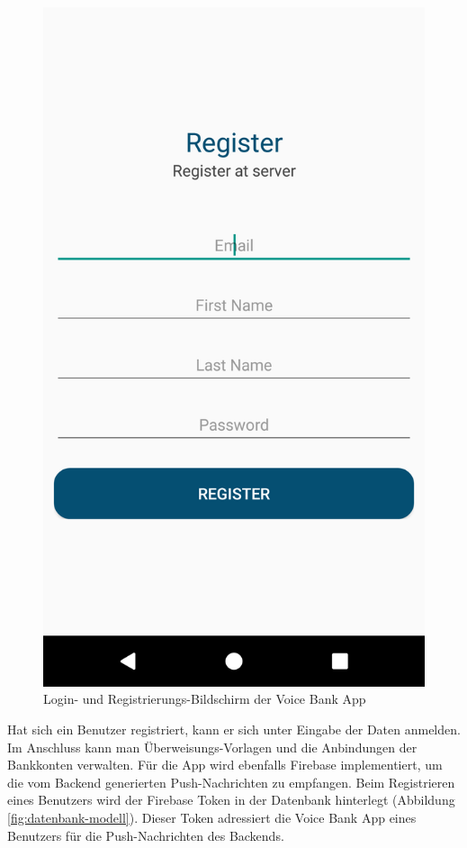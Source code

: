\begin{figure}[h]
\begin{minipage}[b]{0.45\textwidth}
    \includegraphics[width=\textwidth]{bilder/4_appRegister.png}
  \end{minipage}
  \caption{Login- und Registrierungs-Bildschirm der Voice Bank App}
  \label{fig:app-login}
\end{figure}

Hat sich ein Benutzer registriert, kann er sich unter Eingabe der Daten anmelden. Im Anschluss kann man Überweisungs-Vorlagen und die Anbindungen der Bankkonten verwalten. Für die App wird ebenfalls Firebase implementiert, um die vom Backend generierten Push-Nachrichten zu empfangen. Beim Registrieren eines Benutzers wird der Firebase Token in der Datenbank hinterlegt (\vgl Abbildung \ref{fig:datenbank-modell}). Dieser Token adressiert die Voice Bank App eines Benutzers für die Push-Nachrichten des Backends.

